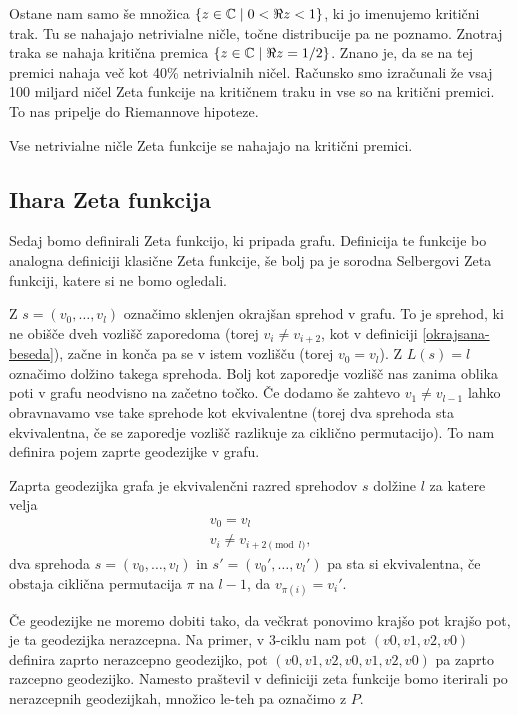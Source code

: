 Ostane nam samo še množica \(\{z\in \mathbb C\mid 0 < \Re z < 1\}\), ki jo imenujemo kritični trak. Tu se nahajajo netrivialne ničle, točne distribucije pa ne poznamo. Znotraj traka se nahaja kritična premica \(\{z\in \mathbb C \mid \Re z = 1/2\}\). Znano je, da se na tej premici nahaja več kot 40\% netrivialnih ničel\cite{Pratt2019}. Računsko smo izračunali že vsaj 100 miljard ničel Zeta funkcije na kritičnem traku in vse so na kritični premici\cite{racunskoniclezeta}. To nas pripelje do Riemannove hipoteze.

\begin{izrek}
    Vse netrivialne ničle Zeta funkcije se nahajajo na kritični premici.
\end{izrek}

\subsection{Ihara Zeta funkcija}
Sedaj bomo definirali Zeta funkcijo, ki pripada grafu. Definicija te funkcije bo analogna definiciji klasične Zeta funkcije, še bolj pa je sorodna Selbergovi Zeta funkciji, katere si ne bomo ogledali\cite{sunada-zetagrafov}.

Z \(s=(v_0, \ldots, v_{l})\) označimo sklenjen okrajšan sprehod v grafu. To je sprehod, ki ne obišče dveh vozlišč zaporedoma (torej \(v_i \neq v_{i+2}\), kot v definiciji \ref{okrajsana-beseda}), začne in konča pa se v istem vozlišču (torej \(v_0 = v_l\)). Z \(L(s)=l\) označimo dolžino takega sprehoda. Bolj kot zaporedje vozlišč nas zanima oblika poti v grafu neodvisno na začetno točko. Če dodamo še zahtevo \(v_1 \neq v_{l-1}\) lahko obravnavamo vse take sprehode kot ekvivalentne (torej dva sprehoda sta ekvivalentna, če se zaporedje vozlišč razlikuje za ciklično permutacijo). To nam definira pojem zaprte geodezijke v grafu. 

\begin{definicija}
    Zaprta geodezijka grafa je ekvivalenčni razred sprehodov \(s\) dolžine \(l\) za katere velja
    \begin{align*}
        v_0 = v_l \\
        v_i \neq v_{i+2 \pmod l},
    \end{align*}
    dva sprehoda \(s=(v_0, \ldots, v_{l})\) in \(s'=(v_0', \ldots, v_{l}')\) pa sta si ekvivalentna, če obstaja ciklična permutacija \(\pi\) na \(l-1\), da \(v_{\pi(i)} = v_i'\). 
\end{definicija}

Če geodezijke ne moremo dobiti tako, da večkrat ponovimo krajšo pot krajšo pot, je ta geodezijka nerazcepna. Na primer, v 3-ciklu nam pot \((v0, v1, v2, v0)\) definira zaprto nerazcepno geodezijko, pot \((v0, v1, v2, v0, v1, v2, v0)\) pa zaprto razcepno geodezijko. Namesto praštevil v definiciji zeta funkcije bomo iterirali po nerazcepnih geodezijkah, množico le-teh pa označimo z \(P\).

